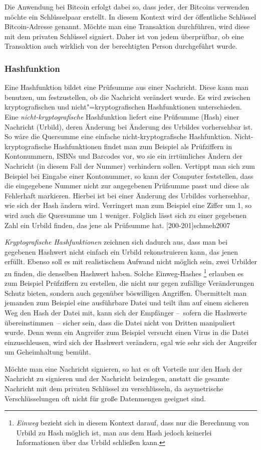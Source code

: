 Die Anwendung bei Bitcoin erfolgt dabei so, dass jeder, der Bitcoins verwenden möchte ein Schlüsselpaar erstellt.
In diesem Kontext wird der öffentliche Schlüssel Bitcoin-Adresse genannt.
Möchte man eine Transaktion durchführen, wird diese mit dem privaten Schlüssel signiert.
Daher ist von jedem überprüfbar, ob eine Transaktion auch wirklich von der berechtigten Person durchgeführt wurde.

\subsubsection{Hashfunktion}

Eine Hashfunktion bildet eine Prüfsumme aus einer Nachricht.
Diese kann man benutzen, um festzustellen, ob die Nachricht verändert wurde.
Es wird zwischen kryptografischen und nicht"=kryptografischen Hashfunktionen unterschieden.
Eine \emph{nicht-kryptografische} Hashfunktion liefert eine Prüfsumme (Hash) einer Nachricht (Urbild), deren Änderung bei Änderung des Urbildes vorhersehbar ist.
So wäre die Quersumme eine einfache nicht-kryptografische Hashfunktion.
Nicht-kryptografische Hashfunktionen findet man zum Beispiel als Prüfziffern in Kontonummern, ISBNs und Barcodes vor, wo sie ein irrtümliches Ändern der Nachricht (in diesem Fall der Nummer) verhindern sollen.
Vertippt man sich zum Beispiel bei Eingabe einer Kontonummer, so kann der Computer feststellen, dass die eingegebene Nummer nicht zur angegebenen Prüfsumme passt und diese als Fehlerhaft markieren.
Hierbei ist bei einer Änderung des Urbildes vorhersehbar, wie sich der Hash ändern wird.
Verringert man zum Beispiel eine Ziffer um 1, so wird auch die Quersumme um 1 weniger.
Folglich lässt sich zu einer gegebenen Zahl ein Urbild finden, das jene als Prüfsumme hat.
[200-201]{schmeh2007}

\emph{Kryptografische Hashfunktionen} zeichnen sich dadurch aus, dass man bei gegebenen Hashwert nicht einfach ein Urbild rekonstruieren kann, das jenen erfüllt.
Ebenso soll es mit realistischem Aufwand nicht möglich sein, zwei Urbilder zu finden, die denselben Hashwert haben.
Solche Einweg-Hashes%
\footnote{\emph{Einweg} bezieht sich in diesem Kontext darauf, dass nur die Berechnung von Urbild zu Hash möglich ist, man aus dem Hash jedoch keinerlei Informationen über das Urbild schließen kann.}
erlauben es zum Beispiel Prüfziffern zu erstellen, die nicht nur gegen zufällige Veränderungen Schutz bieten, sondern auch gegenüber böswilligen Angriffen.
Übermittelt man jemanden zum Beispiel eine ausführbare Datei und teilt ihm auf einem sicheren Weg den Hash der Datei mit, kann sich der Empfänger --~sofern die Hashwerte übereinstimmen~-- sicher sein, dass die Datei nicht von Dritten manipuliert wurde.
Denn wenn ein Angreifer zum Beispiel versucht einen Virus in die Datei einzuschleusen, wird sich der Hashwert verändern, egal wie sehr sich der Angreifer um Geheimhaltung bemüht.

Möchte man eine Nachricht signieren, so hat es oft Vorteile nur den Hash der Nachricht zu signieren und der Nachricht beizulegen, anstatt die gesamte Nachricht mit dem privaten Schlüssel zu verschlüsseln, da asymetrische Verschlüsselungen oft nicht für große Datenmengen geeignet sind.
